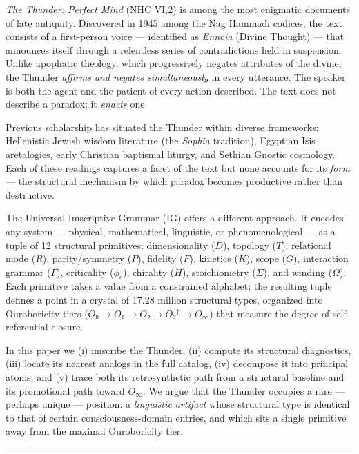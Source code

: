 \documentclass[12pt,a4paper]{article}
\begin{document}
\emph{The Thunder: Perfect Mind} (NHC VI,2) is among the most enigmatic documents of late antiquity. Discovered in 1945 among the Nag Hammadi codices, the text consists of a first-person voice --- identified as \emph{Ennoia} (Divine Thought) --- that announces itself through a relentless series of contradictions held in suspension. Unlike apophatic theology, which progressively negates attributes of the divine, the Thunder \emph{affirms and negates simultaneously} in every utterance. The speaker is both the agent and the patient of every action described. The text does not describe a paradox; it \emph{enacts} one.

Previous scholarship has situated the Thunder within diverse frameworks: Hellenistic Jewish wisdom literature (the \emph{Sophia} tradition), Egyptian Isis aretalogies, early Christian baptismal liturgy, and Sethian Gnostic cosmology. Each of these readings captures a facet of the text but none accounts for its \emph{form} --- the structural mechanism by which paradox becomes productive rather than destructive.

The Universal Imscriptive Grammar (IG) offers a different approach. It encodes any system --- physical, mathematical, linguistic, or phenomenological --- as a tuple of 12 structural primitives: dimensionality ($D$), topology ($T$), relational mode ($R$), parity/symmetry ($P$), fidelity ($F$), kinetics ($K$), scope ($G$), interaction grammar ($\Gamma$), criticality ($\phi_c$), chirality ($H$), stoichiometry ($\Sigma$), and winding ($\Omega$). Each primitive takes a value from a constrained alphabet; the resulting tuple defines a point in a crystal of 17.28 million structural types, organized into Ouroboricity tiers ($O₀ \to O₁ \to O₂ \to O₂^\dagger \to O_{\infty}$) that measure the degree of self-referential closure.

In this paper we (i) imscribe the Thunder, (ii) compute its structural diagnostics, (iii) locate its nearest analogs in the full catalog, (iv) decompose it into principal atoms, and (v) trace both its retrosynthetic path from a structural baseline and its promotional path toward $O_{\infty}$. We argue that the Thunder occupies a rare --- perhaps unique --- position: a \emph{linguistic artifact} whose structural type is identical to that of certain consciousness-domain entries, and which sits a single primitive away from the maximal Ouroboricity tier.

\begin{center}
\rule{0.5\textwidth}{0.4pt}
\end{center}
\end{document}
